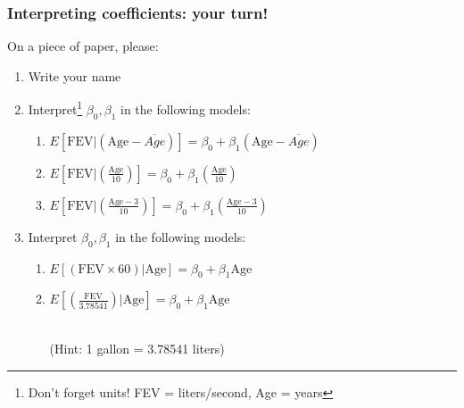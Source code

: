 \documentclass[12pt, 
hyperref={colorlinks=true, linkcolor=blue, urlcolor=cyan}]{beamer}
\begin{document}
\begin{frame}
\frametitle{Interpreting coefficients: your turn!}
On a piece of paper, please:\vspace{-0.3cm}
\begin{enumerate} \itemsep +5pt
\item Write your name
\item Interpret\footnote[frame]{\color{blue} Don't forget units! FEV = liters/second, Age = years} $\beta_0, \beta_1$ in the following models:
	\begin{enumerate}\itemsep +5pt
	\item $E[\text{FEV}|\left(\text{Age}-\overline{Age}\right)] = \beta_0 + \beta_1 \left(\text{Age}-\overline{Age}\right)$ 
	\item $E[\text{FEV}|\left(\frac{\text{Age}}{10}\right)] = \beta_0 + \beta_1 \left(\frac{\text{Age}}{10}\right)$ 
	\item $E[\text{FEV}|\left(\frac{\text{Age}-3}{10}\right)] = \beta_0 + \beta_1 \left(\frac{\text{Age}-3}{10}\right)$ 
	\end{enumerate}
\item Interpret $\beta_0, \beta_1$ in the following models:
	\begin{enumerate}\itemsep +5pt
	\item $E[(\text{FEV}\times 60)|\text{Age}] = \beta_0 + \beta_1 \text{Age}$ 
	\item $E[\left(\frac{\text{FEV}}{3.78541}\right)|\text{Age}] = \beta_0 + \beta_1 \text{Age}$ \begin{scriptsize}\\(Hint: 1 gallon = 3.78541 liters)\end{scriptsize}
	\end{enumerate}
\end{enumerate}
\end{frame}


\end{document}
